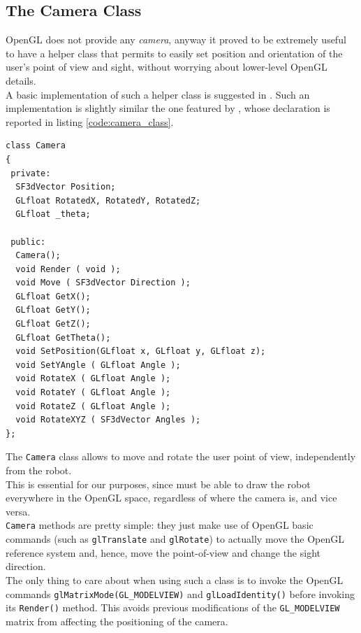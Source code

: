 \subsection{The Camera Class}
\label{rear:classes:cameraclass}

OpenGL does not provide any \textit{camera}, anyway it proved 
to be extremely useful to have a helper class that permits 
to easily set position and orientation of the user's 
point of view and sight, without worrying about lower-level 
OpenGL details.
\\
A basic implementation of such a helper class is suggested 
in \cite{opengl:camera}. Such an implementation is slightly 
similar the one featured by \framework{}, whose 
declaration is reported in listing \ref{code:camera_class}.
\\
\begin{lstlisting}[caption={\texttt{Camera} class declaration}, label={code:camera_class}]
class Camera
{
 private:
  SF3dVector Position;
  GLfloat RotatedX, RotatedY, RotatedZ;	
  GLfloat _theta;

 public:
  Camera();
  void Render ( void );
  void Move ( SF3dVector Direction );
  GLfloat GetX();
  GLfloat GetY();
  GLfloat GetZ();
  GLfloat GetTheta();
  void SetPosition(GLfloat x, GLfloat y, GLfloat z);
  void SetYAngle ( GLfloat Angle );
  void RotateX ( GLfloat Angle );
  void RotateY ( GLfloat Angle );
  void RotateZ ( GLfloat Angle );
  void RotateXYZ ( SF3dVector Angles );
};
\end{lstlisting}

The \texttt{Camera} class allows to move and rotate the user 
point of view, independently from the robot.
\\
This is essential for our purposes, since \framework{}
must be able to draw the robot everywhere in the OpenGL space, 
regardless of where the camera is, and vice versa.
\\
\texttt{Camera} methods are pretty simple: they just make 
use of OpenGL basic commands (such as \texttt{glTranslate} 
and \texttt{glRotate}) to actually move the OpenGL reference 
system and, hence, move the point-of-view and change the sight 
direction.
\\
The only thing to care about when using such a class is 
to invoke the OpenGL commands \texttt{glMatrixMode(GL\_MODELVIEW)} 
and \texttt{glLoadIdentity()} before invoking its 
\texttt{Render()} method. This avoids previous modifications 
of the \texttt{GL\_MODELVIEW} matrix from affecting the 
positioning of the camera.


